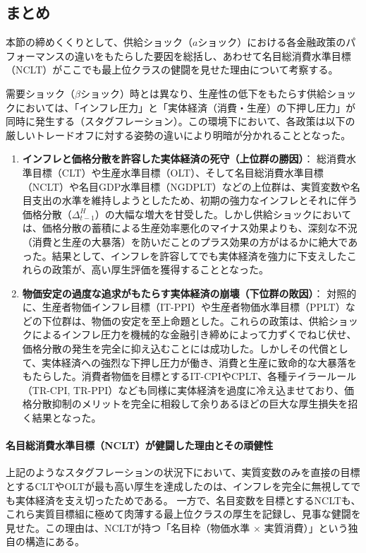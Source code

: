 
\subsection{まとめ}
\label{sec:chapter5_a_shock_summary}
本節の締めくくりとして、供給ショック（\(a\)ショック）における各金融政策のパフォーマンスの違いをもたらした要因を総括し、あわせて名目総消費水準目標（NCLT）がここでも最上位クラスの健闘を見せた理由について考察する。

需要ショック（\(\beta\)ショック）時とは異なり、生産性の低下をもたらす供給ショックにおいては、「インフレ圧力」と「実体経済（消費・生産）の下押し圧力」が同時に発生する（スタグフレーション）。この環境下において、各政策は以下の厳しいトレードオフに対する姿勢の違いにより明暗が分かれることとなった。

\begin{enumerate}
    \item
    \label{itm:chapter5_a_shock_summary_real_economy_support}
        \textbf{インフレと価格分散を許容した実体経済の死守（上位群の勝因）}：
        総消費水準目標（CLT）や生産水準目標（OLT）、そして名目総消費水準目標（NCLT）や名目GDP水準目標（NGDPLT）などの上位群は、実質変数や名目支出の水準を維持しようとしたため、初期の強力なインフレとそれに伴う価格分散（\(\Delta_{t-1}^H\)）の大幅な増大を甘受した。しかし供給ショックにおいては、価格分散の蓄積による生産効率悪化のマイナス効果よりも、深刻な不況（消費と生産の大暴落）を防いだことのプラス効果の方がはるかに絶大であった。結果として、インフレを許容してでも実体経済を強力に下支えしたこれらの政策が、高い厚生評価を獲得することとなった。
    \item
    \label{itm:chapter5_a_shock_summary_inflation_control}
        \textbf{物価安定の過度な追求がもたらす実体経済の崩壊（下位群の敗因）}：
        対照的に、生産者物価インフレ目標（IT-PPI）や生産者物価水準目標（PPLT）などの下位群は、物価の安定を至上命題とした。これらの政策は、供給ショックによるインフレ圧力を機械的な金融引き締めによって力ずくでねじ伏せ、価格分散の発生を完全に抑え込むことには成功した。しかしその代償として、実体経済への強烈な下押し圧力が働き、消費と生産に致命的な大暴落をもたらした。消費者物価を目標とするIT-CPIやCPLT、各種テイラールール（TR-CPI, TR-PPI）なども同様に実体経済を過度に冷え込ませており、価格分散抑制のメリットを完全に相殺して余りあるほどの巨大な厚生損失を招く結果となった。
\end{enumerate}

\paragraph{名目総消費水準目標（NCLT）が健闘した理由とその頑健性}
\label{sec:chapter5_a_shock_summary_nclt_robustness}
上記のようなスタグフレーションの状況下において、実質変数のみを直接の目標とするCLTやOLTが最も高い厚生を達成したのは、インフレを完全に無視してでも実体経済を支え切ったためである。
一方で、名目変数を目標とするNCLTも、これら実質目標組に極めて肉薄する最上位クラスの厚生を記録し、見事な健闘を見せた。この理由は、NCLTが持つ「名目枠（物価水準 \(\times\) 実質消費）」という独自の構造にある。

